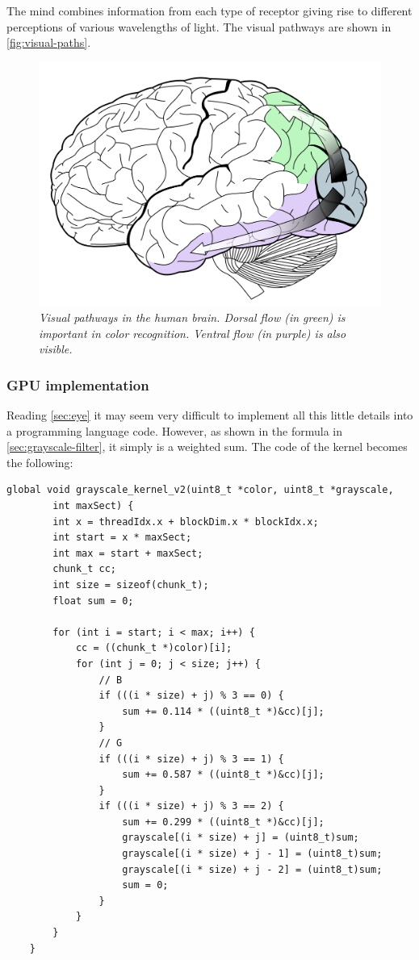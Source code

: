 \documentclass[paper=a4, fontsize=10pt]{scrartcl}	%
\begin{document}
	The mind combines information from each type of receptor giving rise to different perceptions of various wavelengths of light. The visual pathways are shown in \autoref{fig:visual-paths}.

	\begin{figure}[H]
		\centering
		\includegraphics[width=0.65\linewidth]{images/eye/2880px-Ventral-dorsal_streams.svg.png}
		\caption{\textit{Visual pathways in the human brain. Dorsal flow (in green) is important in color recognition. Ventral flow (in purple) is also visible.}}
		\label{fig:visual-paths}
	\end{figure}


	\subsubsection{GPU implementation}

	Reading \autoref{sec:eye} it may seem very difficult to implement all this little details into a programming language code. However, as shown in the formula in \autoref{sec:grayscale-filter}, it simply is a weighted sum. The code of the kernel becomes the following:

	\begin{lstlisting}[style=CStyle]
	global void grayscale_kernel_v2(uint8_t *color, uint8_t *grayscale, 
		int maxSect) {
		int x = threadIdx.x + blockDim.x * blockIdx.x;
		int start = x * maxSect;
		int max = start + maxSect;
		chunk_t cc;
		int size = sizeof(chunk_t);
		float sum = 0;
	
		for (int i = start; i < max; i++) {
			cc = ((chunk_t *)color)[i];
			for (int j = 0; j < size; j++) {
				// B
				if (((i * size) + j) % 3 == 0) {
					sum += 0.114 * ((uint8_t *)&cc)[j];
				}
				// G
				if (((i * size) + j) % 3 == 1) {
					sum += 0.587 * ((uint8_t *)&cc)[j];
				}
				if (((i * size) + j) % 3 == 2) {
					sum += 0.299 * ((uint8_t *)&cc)[j];
					grayscale[(i * size) + j] = (uint8_t)sum;
					grayscale[(i * size) + j - 1] = (uint8_t)sum;
					grayscale[(i * size) + j - 2] = (uint8_t)sum;
					sum = 0;
				}
			}
		}
	}
	\end{lstlisting}
\end{document}
